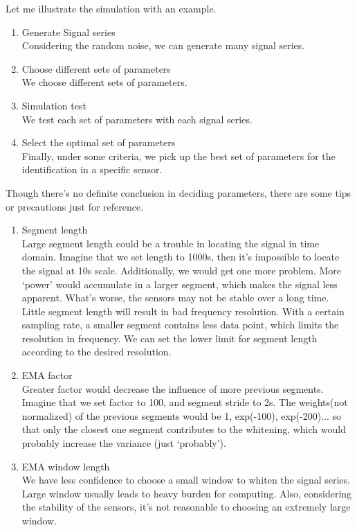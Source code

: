 \documentclass[
12pt, %
a4paper %
]{extreport}
\theoremstyle{plain}
\begin{document}
Let me illustrate the simulation with an example.
\begin{enumerate}
\item Generate Signal series\\
Considering the random noise, we can generate many signal series.
\item Choose different sets of parameters\\
We choose different sets of parameters. 
\item Simulation test\\
We test each set of parameters with each signal series.
\item Select the optimal set of parameters\\
Finally, under some criteria, we pick up the best set of parameters for the identification in a specific sensor. 
\end{enumerate}
Though there’s no definite conclusion in deciding parameters, there are some tips or precautions just for reference. 
\begin{enumerate}
\item Segment length\\
Large segment length could be a trouble in locating the signal in time domain. Imagine that we set length to 1000s, then it’s impossible to locate the signal at 10s scale. Additionally, we would get one more problem. More ‘power’ would accumulate in a larger segment, which makes the signal less apparent. What’s worse, the sensors may not be stable over a long time.
Little segment length will result in bad frequency resolution. With a certain sampling rate, a smaller segment contains less data point, which limits the resolution in frequency. We can set the lower limit for segment length according to the desired resolution.
\item EMA factor\\
Greater factor would decrease the influence of more previous segments. Imagine that we set factor to 100, and segment stride to 2s. The weights(not normalized) of the previous segments would be 1, exp(-100), exp(-200)... so that only the closest one segment contributes to the whitening, which would probably increase the variance (just ‘probably’).
\item EMA window length\\
We have less confidence to choose a small window to whiten the signal series.
Large window usually leads to heavy burden for computing. Also, considering the stability of the sensors, it’s not reasonable to choosing an extremely large window.
\end{enumerate}

%


\end{document}
